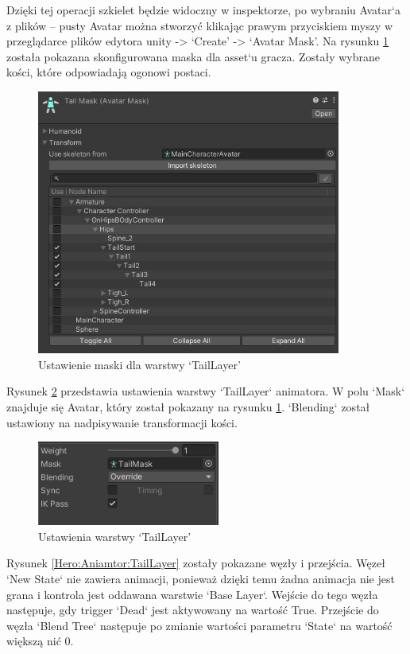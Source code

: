 \documentclass[12pt,twoside]{article}
\begin{document}
Dzięki tej operacji szkielet będzie widoczny w inspektorze, po wybraniu Avatar`a
z plików -- pusty Avatar można stworzyć klikając prawym przyciskiem myszy w
przeglądarce plików edytora unity -> `Create' -> `Avatar Mask'.  Na rysunku
\ref{Hero:Avatar:Setting} została pokazana skonfigurowana maska dla asset`u
gracza. Zostały wybrane kości, które odpowiadają ogonowi postaci.

\begin{figure}[!ht]
    \centering
	\includegraphics[width=10cm]{RealizacjaProjektu/UnityPictires/Animator/Player1_Avatar_Setting.jpg}
	\caption{Ustawienie maski dla warstwy `TailLayer'}
    \label{Hero:Avatar:Setting}
\end{figure}

Rysunek \ref{Hero:Aniamtor:TailLayerSetting} przedstawia ustawienia warstwy
`TailLayer` animatora. W polu `Mask` znajduje się Avatar, który został pokazany
na rysunku \ref{Hero:Avatar:Setting}. `Blending` został ustawiony na
nadpisywanie transformacji kości. 

\begin{figure}[!ht]
    \centering
	\includegraphics[width=6cm]{RealizacjaProjektu/UnityPictires/Animator/Player1_Animator_TailLayer_settings.jpg}
	\caption{Ustawienia warstwy `TailLayer'}
    \label{Hero:Aniamtor:TailLayerSetting}
\end{figure}

Rysunek \ref{Hero:Aniamtor:TailLayer} zostały pokazane węzły i przejścia. Węzeł
`New State` nie zawiera animacji, ponieważ dzięki temu żadna animacja nie jest
grana i kontrola jest oddawana warstwie `Base Layer`. Wejście do tego węzła
następuje, gdy trigger `Dead` jest aktywowany na wartość True. Przejście do
węzła `Blend Tree` następuje po zmianie wartości parametru `State` na wartość
większą nić 0.
\end{document}
